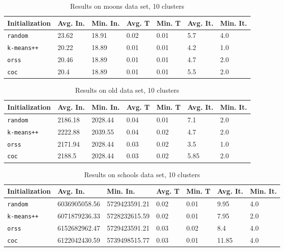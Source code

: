 \documentclass[twoside, 11pt]{article}
\begin{document}
		\begin{table}[p]
			\begin{center}
				\begin{tabular}{|l|l|l|l|l|l|l|}
					\hline
					Initialization & Avg. In. & Min. In. & Avg. T & Min. T & Avg. It. & Min. It.\\\hline
					\texttt{random} & 23.62 & 18.91 & 0.02 & 0.01 & 5.7 & 4.0\\\hline
					\texttt{k-means++} & 20.22 & 18.89 & 0.01 & 0.01 & 4.2 & 1.0\\\hline
					\texttt{orss} & 20.46 & 18.89 & 0.01 & 0.01 & 4.7 & 2.0\\\hline
					\texttt{coc} & 20.4 & 18.89 & 0.01 & 0.01 & 5.5 & 2.0\\\hline
				\end{tabular}
				\caption{Results on moons data set, 10 clusters}
				\label{tbl:moons10}
			\end{center}
		\end{table}
		
		\begin{table}[p]
			\begin{center}
				\begin{tabular}{|l|l|l|l|l|l|l|}
					\hline
					Initialization & Avg. In. & Min. In. & Avg. T & Min. T & Avg. It. & Min. It.\\\hline
					\texttt{random} & 2186.18 & 2028.44 & 0.04 & 0.01 & 7.1 & 2.0\\\hline
					\texttt{k-means++} & 2222.88 & 2039.55 & 0.04 & 0.02 & 4.7 & 2.0\\\hline
					\texttt{orss} & 2171.94 & 2028.44 & 0.03 & 0.02 & 3.5 & 1.0\\\hline
					\texttt{coc} & 2188.5 & 2028.44 & 0.03 & 0.02 & 5.85 & 2.0\\\hline
				\end{tabular}
				\caption{Results on old data set, 10 clusters}
				\label{tbl:old10}
			\end{center}
		\end{table}
		
		\begin{table}[p]
			\begin{center}
				\begin{tabular}{|l|l|l|l|l|l|l|}
					\hline
					Initialization & Avg. In. & Min. In. & Avg. T & Min. T & Avg. It. & Min. It.\\\hline
					\texttt{random} & 6036905058.56 & 5729423591.21 & 0.02 & 0.01 & 9.95 & 4.0\\\hline
					\texttt{k-means++} & 6071879236.33 & 5728232615.59 & 0.02 & 0.01 & 7.95 & 2.0\\\hline
					\texttt{orss} & 6152682962.47 & 5729423591.21 & 0.03 & 0.02 & 8.4 & 4.0\\\hline
					\texttt{coc} & 6122042430.59 & 5739498515.77 & 0.03 & 0.01 & 11.85 & 4.0\\\hline
				\end{tabular}
				\caption{Results on schools data set, 10 clusters}
				\label{tbl:schools10}
			\end{center}
		\end{table}
		
\end{document}
